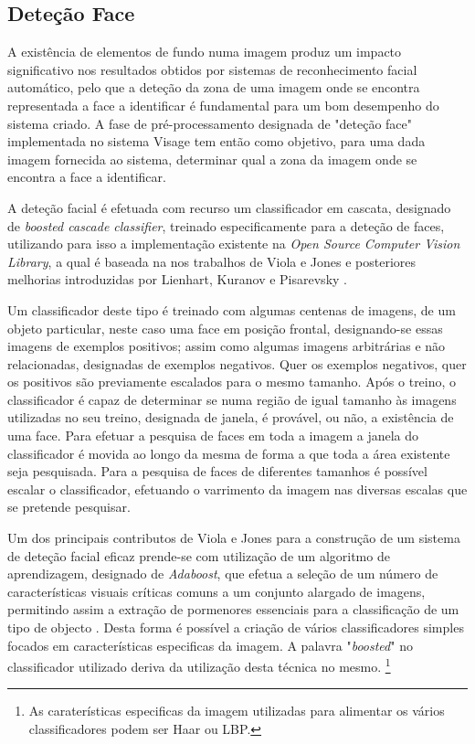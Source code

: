 \subsection{Deteção Face}
A existência de elementos de fundo numa imagem produz um impacto significativo nos resultados obtidos por sistemas de reconhecimento facial automático, pelo que a deteção da zona de uma imagem onde se encontra representada a face a identificar é fundamental para um bom desempenho do sistema criado. A fase de pré-processamento designada de "deteção face" implementada no sistema Visage tem então como objetivo, para uma dada imagem fornecida ao sistema, determinar qual a zona da imagem onde se encontra a face a identificar.

A deteção facial é efetuada com recurso um classificador em cascata, designado de \textit{boosted cascade classifier},  treinado especificamente para a deteção de faces, utilizando para isso a implementação existente na \textit{Open Source Computer Vision Library}, a qual é baseada na nos trabalhos de Viola e Jones \cite{Viola2001} e posteriores melhorias introduzidas por Lienhart, Kuranov e Pisarevsky \cite{Lienhart2003}.

Um classificador deste tipo é treinado com algumas centenas de imagens, de um objeto particular, neste caso uma face em posição frontal, designando-se essas imagens de exemplos positivos; assim como algumas imagens arbitrárias e não relacionadas, designadas de exemplos negativos. Quer os exemplos negativos, quer os positivos são previamente escalados para o mesmo tamanho. Após o treino, o classificador é capaz de determinar se numa região de igual tamanho às imagens utilizadas no seu treino, designada de janela, é provável, ou não,  a existência de uma face. Para efetuar a pesquisa de faces em toda a imagem a janela do classificador é movida ao longo da mesma de forma a que toda a área existente seja pesquisada. Para a pesquisa de faces de diferentes tamanhos é possível escalar o classificador, efetuando o varrimento da imagem nas diversas escalas que se pretende pesquisar.

Um dos principais contributos de Viola e Jones para a construção de um sistema de deteção facial eficaz prende-se com utilização de um algoritmo de aprendizagem, designado de \textit{Adaboost}, que efetua a seleção de um número de características visuais críticas comuns a um conjunto alargado de imagens, permitindo assim a extração de pormenores essenciais para a classificação de um tipo de objecto \cite{Viola2001}. Desta forma é possível a criação de vários classificadores simples focados em características especificas da imagem. A palavra "\textit{boosted}" no classificador utilizado deriva da utilização desta técnica no mesmo. \footnote{As caraterísticas especificas da imagem utilizadas para alimentar os vários classificadores podem ser Haar ou LBP.}
 
